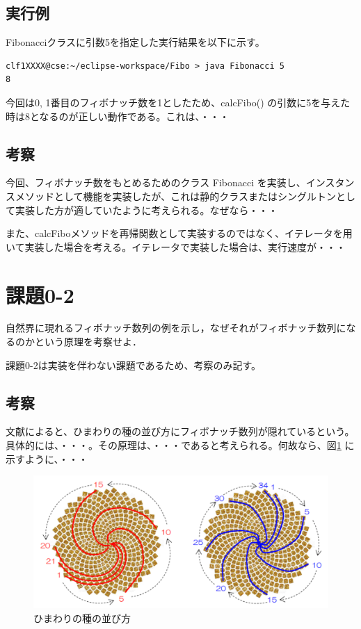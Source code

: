 \documentclass[a4j]{jarticle}
\begin{document}
\subsection{実行例}
Fibonacciクラスに引数5を指定した実行結果を以下に示す。

\begin{lstlisting}
clf1XXXX@cse:~/eclipse-workspace/Fibo > java Fibonacci 5
8
\end{lstlisting}

今回は0, 1番目のフィボナッチ数を1としたため、calcFibo() の引数に5を与えた時は8となるのが正しい動作である。これは、・・・
\subsection{考察}
今回、フィボナッチ数をもとめるためのクラス Fibonacci を実装し、インスタンスメソッドとして機能を実装したが、これは静的クラスまたはシングルトンとして実装した方が適していたように考えられる。なぜなら・・・

また、calcFiboメソッドを再帰関数として実装するのではなく、イテレータを用いて実装した場合を考える。イテレータで実装した場合は、実行速度が・・・


\section{課題0-2}
\begin{screen}
  自然界に現れるフィボナッチ数列の例を示し，なぜそれがフィボナッチ数列になるのかという原理を考察せよ．
\end{screen}

課題0-2は実装を伴わない課題であるため、考察のみ記す。

\subsection{考察}
文献\cite{kijima2012}によると、ひまわりの種の並び方にフィボナッチ数列が隠れているという。具体的には、・・・。その原理は、・・・であると考えられる。何故なら、図\ref{fig:himawari} \cite{notty} に示すように、・・・

\begin{figure}[!hbt]
  \centering
  \includegraphics[bb=0 0 543 245,width=0.6\linewidth]{himawari.png}
  \caption{ひまわりの種の並び方\cite{notty}}
  \label{fig:himawari}
\end{figure}
\end{document}
